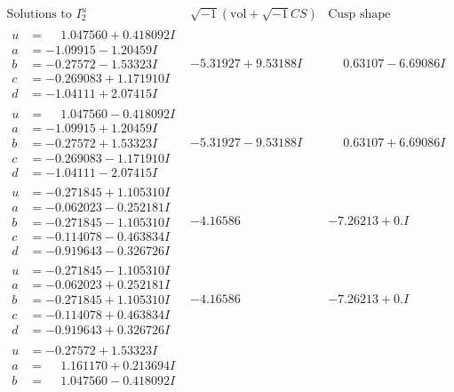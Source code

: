 \documentclass[1p]{elsarticle_modified}
\theoremstyle{definition}
\newcommand{\I}{\sqrt{-1}}
\begin{document}
$$\begin{array}{c|c|c}  
\text{Solutions to }I^u_{2}& \I (\text{vol} + \sqrt{-1}CS) & \text{Cusp shape}\\
 \hline 
\begin{aligned}
u &= \phantom{-}1.047560 + 0.418092 I \\
a &= -1.09915 - 1.20459 I \\
b &= -0.27572 - 1.53323 I \\
c &= -0.269083 + 1.171910 I \\
d &= -1.04111 + 2.07415 I\end{aligned}
 & -5.31927 + 9.53188 I & \phantom{-}0.63107 - 6.69086 I \\ \hline\begin{aligned}
u &= \phantom{-}1.047560 - 0.418092 I \\
a &= -1.09915 + 1.20459 I \\
b &= -0.27572 + 1.53323 I \\
c &= -0.269083 - 1.171910 I \\
d &= -1.04111 - 2.07415 I\end{aligned}
 & -5.31927 - 9.53188 I & \phantom{-}0.63107 + 6.69086 I \\ \hline\begin{aligned}
u &= -0.271845 + 1.105310 I \\
a &= -0.062023 - 0.252181 I \\
b &= -0.271845 - 1.105310 I \\
c &= -0.114078 - 0.463834 I \\
d &= -0.919643 - 0.326726 I\end{aligned}
 & -4.16586\phantom{ +0.000000I} & -7.26213 + 0. I\phantom{ +0.000000I} \\ \hline\begin{aligned}
u &= -0.271845 - 1.105310 I \\
a &= -0.062023 + 0.252181 I \\
b &= -0.271845 + 1.105310 I \\
c &= -0.114078 + 0.463834 I \\
d &= -0.919643 + 0.326726 I\end{aligned}
 & -4.16586\phantom{ +0.000000I} & -7.26213 + 0. I\phantom{ +0.000000I} \\ \hline\begin{aligned}
u &= -0.27572 + 1.53323 I \\
a &= \phantom{-}1.161170 + 0.213694 I \\
b &= \phantom{-}1.047560 - 0.418092 I \\

\end{aligned}
\end{array}$$
\end{document}
